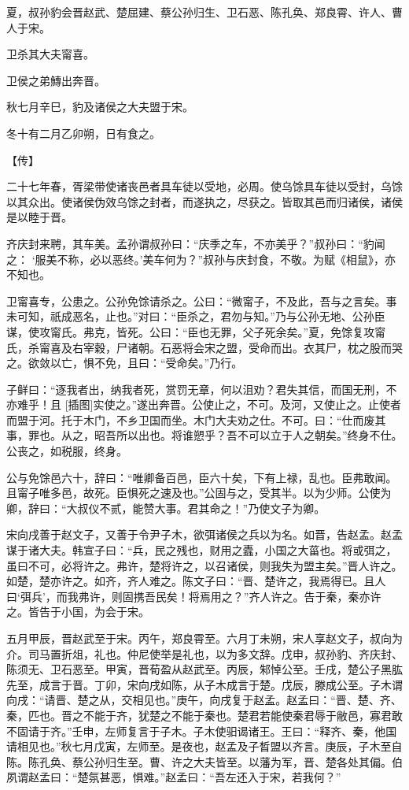 \documentclass[a4paper,12pt,UTF8,twoside]{ctexbook}
\begin{document}
夏，叔孙豹会晋赵武、楚屈建、蔡公孙归生、卫石恶、陈孔奂、郑良霄、许人、曹人于宋。

卫杀其大夫甯喜。

卫侯之弟鱄出奔晋。

秋七月辛巳，豹及诸侯之大夫盟于宋。

冬十有二月乙卯朔，日有食之。

【传】

二十七年春，胥梁带使诸丧邑者具车徒以受地，必周。使乌馀具车徒以受封，乌馀以其众出。使诸侯伪效乌馀之封者，而遂执之，尽获之。皆取其邑而归诸侯，诸侯是以睦于晋。

齐庆封来聘，其车美。孟孙谓叔孙曰：“庆季之车，不亦美乎？”叔孙曰：“豹闻之： ‘服美不称，必以恶终。’美车何为？”叔孙与庆封食，不敬。为赋《相鼠》，亦不知也。

卫甯喜专，公患之。公孙免馀请杀之。公曰：“微甯子，不及此，吾与之言矣。事未可知，祇成恶名，止也。”对曰：“臣杀之，君勿与知。”乃与公孙无地、公孙臣谋，使攻甯氏。弗克，皆死。公曰：“臣也无罪，父子死余矣。”夏，免馀复攻甯氏，杀甯喜及右宰穀，尸诸朝。石恶将会宋之盟，受命而出。衣其尸，枕之股而哭之。欲敛以亡，惧不免，且曰：“受命矣。”乃行。

子鲜曰：“逐我者出，纳我者死，赏罚无章，何以沮劝？君失其信，而国无刑，不亦难乎！且 [插图]实使之。”遂出奔晋。公使止之，不可。及河，又使止之。止使者而盟于河。托于木门，不乡卫国而坐。木门大夫劝之仕。不可。曰：“仕而废其事，罪也。从之，昭吾所以出也。将谁愬乎？吾不可以立于人之朝矣。”终身不仕。公丧之，如税服，终身。

公与免馀邑六十，辞曰：“唯卿备百邑，臣六十矣，下有上禄，乱也。臣弗敢闻。且甯子唯多邑，故死。臣惧死之速及也。”公固与之，受其半。以为少师。公使为卿，辞曰：“大叔仪不贰，能赞大事。君其命之！”乃使文子为卿。

宋向戌善于赵文子，又善于令尹子木，欲弭诸侯之兵以为名。如晋，告赵孟。赵孟谋于诸大夫。韩宣子曰：“兵，民之残也，财用之蠹，小国之大菑也。将或弭之，虽曰不可，必将许之。弗许，楚将许之，以召诸侯，则我失为盟主矣。”晋人许之。如楚，楚亦许之。如齐，齐人难之。陈文子曰：“晋、楚许之，我焉得已。且人曰‘弭兵’，而我弗许，则固携吾民矣！将焉用之？”齐人许之。告于秦，秦亦许之。皆告于小国，为会于宋。

五月甲辰，晋赵武至于宋。丙午，郑良霄至。六月丁未朔，宋人享赵文子，叔向为介。司马置折俎，礼也。仲尼使举是礼也，以为多文辞。戊申，叔孙豹、齐庆封、陈须无、卫石恶至。甲寅，晋荀盈从赵武至。丙辰，邾悼公至。壬戌，楚公子黑肱先至，成言于晋。丁卯，宋向戌如陈，从子木成言于楚。戊辰，滕成公至。子木谓向戌：“请晋、楚之从，交相见也。”庚午，向戌复于赵孟。赵孟曰：“晋、楚、齐、秦，匹也。晋之不能于齐，犹楚之不能于秦也。楚君若能使秦君辱于敝邑，寡君敢不固请于齐。”壬申，左师复言于子木。子木使驲谒诸王。王曰：“释齐、秦，他国请相见也。”秋七月戊寅，左师至。是夜也，赵孟及子晳盟以齐言。庚辰，子木至自陈。陈孔奂、蔡公孙归生至。曹、许之大夫皆至。以藩为军，晋、楚各处其偏。伯夙谓赵孟曰：“楚氛甚恶，惧难。”赵孟曰：“吾左还入于宋，若我何？”
\end{document}
